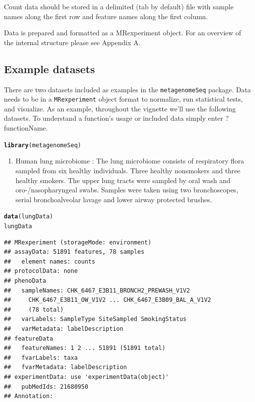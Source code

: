\documentclass[a4paper,11pt]{article}\usepackage[]{graphicx}\usepackage[]{color}
\makeatletter
\newcommand{\hlstd}[1]{\textcolor[rgb]{0.345,0.345,0.345}{#1}}%
\newcommand{\hlkwd}[1]{\textcolor[rgb]{0.737,0.353,0.396}{\textbf{#1}}}%
\newenvironment{kframe}{%
 \def\at@end@of@kframe{}%
 \ifinner\ifhmode%
  \def\at@end@of@kframe{\end{minipage}}%
  \begin{minipage}{\columnwidth}%
 \fi\fi%
 \def\FrameCommand##1{\hskip\@totalleftmargin \hskip-\fboxsep
 \colorbox{shadecolor}{##1}\hskip-\fboxsep
     \hskip-\linewidth \hskip-\@totalleftmargin \hskip\columnwidth}%
 \MakeFramed {\advance\hsize-\width
   \@totalleftmargin\z@ \linewidth\hsize
   \@setminipage}}%
 {\par\unskip\endMakeFramed%
 \at@end@of@kframe}
\newenvironment{knitrout}{}{} %
\makeatother
\begin{document}
Count data should be stored in a delimited (tab by default) file with sample names
along the first row and feature names along the first column.

Data is prepared and formatted as a MRexperiment object. For an overview of the internal structure please see Appendix A.

\subsection{Example datasets}
There are two datasets included as examples in the \texttt{metagenomeSeq} package. Data needs to be in a \texttt{MRexperiment} object format to normalize, run statistical tests, and visualize. As an example, throughout the vignette we'll use the following datasets. 
To understand a function's usage or included data simply enter ?functionName.

\begin{knitrout}
\color{fgcolor}\begin{kframe}
\begin{alltt}
\hlkwd{library}\hlstd{(metagenomeSeq)}
\end{alltt}
\end{kframe}
\end{knitrout}


\begin{enumerate}
\item Human lung microbiome \cite{charlson}:
The lung microbiome consists of respiratory flora sampled from six healthy individuals. Three healthy nonsmokers and three healthy smokers. The upper lung tracts were sampled by oral wash and oro-/nasopharyngeal swabs. Samples were taken using two bronchoscopes, serial bronchoalveolar lavage and lower airway protected brushes.
\end{enumerate}
\begin{knitrout}
\color{fgcolor}\begin{kframe}
\begin{alltt}
\hlkwd{data}\hlstd{(lungData)}
\hlstd{lungData}
\end{alltt}
\begin{verbatim}
## MRexperiment (storageMode: environment)
## assayData: 51891 features, 78 samples 
##   element names: counts 
## protocolData: none
## phenoData
##   sampleNames: CHK_6467_E3B11_BRONCH2_PREWASH_V1V2
##     CHK_6467_E3B11_OW_V1V2 ... CHK_6467_E3B09_BAL_A_V1V2
##     (78 total)
##   varLabels: SampleType SiteSampled SmokingStatus
##   varMetadata: labelDescription
## featureData
##   featureNames: 1 2 ... 51891 (51891 total)
##   fvarLabels: taxa
##   fvarMetadata: labelDescription
## experimentData: use 'experimentData(object)'
##   pubMedIds: 21680950 
## Annotation:
\end{verbatim}
\end{kframe}
\end{knitrout}
\end{document}
